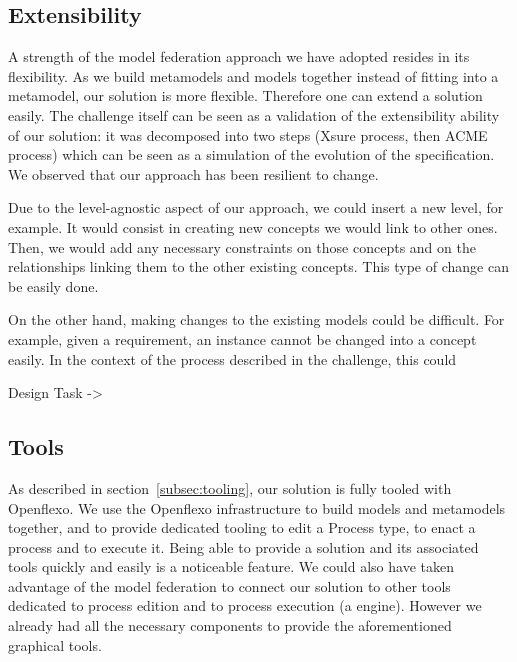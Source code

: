   \subsection{Extensibility}


  A strength of the  model federation approach we have adopted resides in its
  flexibility. As we build metamodels and models together instead of fitting
  into a metamodel, our solution is more flexible. Therefore one can extend a
  solution easily. The challenge itself can be seen as a validation of the
  extensibility ability of our solution: it was decomposed into two steps
  (Xsure process, then ACME process) which can be seen as a simulation of the
  evolution of the  specification. We observed that our approach has been
  resilient to change.

  Due to the level-agnostic aspect of our approach, we could insert a new
  level, for example. It would consist in creating new concepts we would link
  to other ones. Then, we would add any necessary constraints on those concepts
  and on the relationships linking them to the other existing concepts. This type of change can be easily done.
  
  On the other hand, making changes to the existing models could be difficult. For example, given a requirement, an instance cannot be changed into a concept easily. In the context of the process described in the challenge, this could 
  
  Design Task -> 
  


  
\subsection{Tools}


As described in section~\ref{subsec:tooling}, our solution is fully tooled with
Openflexo.  We use the Openflexo infrastructure to build models and metamodels
together, and to provide dedicated tooling to edit a Process type, to enact a
process and to execute it. Being able to provide a solution and its associated
tools quickly and easily is a noticeable feature.  We could also have taken
advantage of the model federation to connect our solution to other tools
dedicated to process edition and to process execution (\eg a \BPMN engine).
However we already had all the necessary components to provide the
aforementioned graphical tools.

